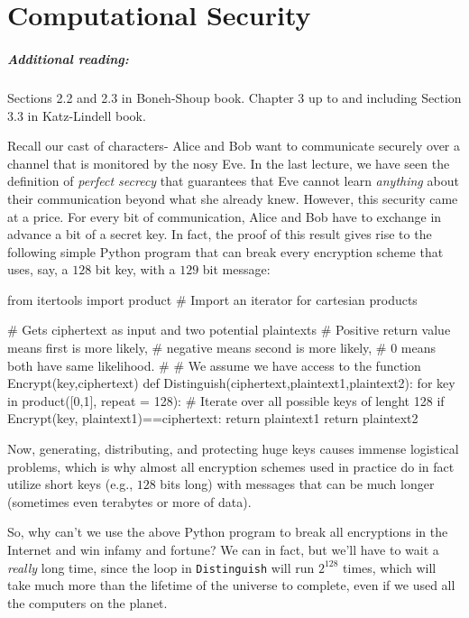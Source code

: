 \chapter{Computational Security}\label{Computational-Security}

\paragraph{Additional reading:} Sections 2.2 and 2.3 in Boneh-Shoup
book. Chapter 3 up to and including Section 3.3 in Katz-Lindell book.

Recall our cast of characters- Alice and Bob want to communicate
securely over a channel that is monitored by the nosy Eve. In the last
lecture, we have seen the definition of \emph{perfect secrecy} that
guarantees that Eve cannot learn \emph{anything} about their
communication beyond what she already knew. However, this security came
at a price. For every bit of communication, Alice and Bob have to
exchange in advance a bit of a secret key. In fact, the proof of this
result gives rise to the following simple Python program that can break
every encryption scheme that uses, say, a \(128\) bit key, with a
\(129\) bit message:

\begin{code}
from itertools import product # Import an iterator for cartesian products

# Gets ciphertext as input and two potential plaintexts
# Positive return value means first is more likely,
# negative means second is more likely,
# 0 means both have same likelihood.
#
# We assume we have access to the function Encrypt(key,ciphertext)
def Distinguish(ciphertext,plaintext1,plaintext2):
    for key in product([0,1], repeat = 128): # Iterate over all possible keys of lenght 128
        if Encrypt(key, plaintext1)==ciphertext:
            return plaintext1
    return plaintext2
\end{code}

Now, generating, distributing, and protecting huge keys causes immense
logistical problems, which is why almost all encryption schemes used in
practice do in fact utilize short keys (e.g., \(128\) bits long) with
messages that can be much longer (sometimes even terabytes or more of
data).

So, why can't we use the above Python program to break all encryptions
in the Internet and win infamy and fortune? We can in fact, but we'll
have to wait a \emph{really} long time, since the loop in
\texttt{Distinguish} will run \(2^{128}\) times, which will take much
more than the lifetime of the universe to complete, even if we used all
the computers on the planet.

